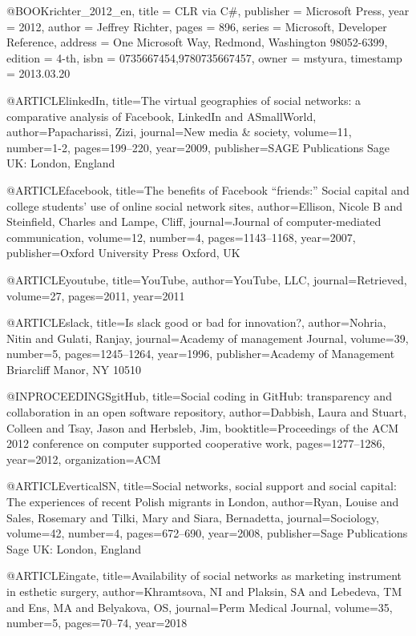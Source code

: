 @BOOK{richter_2012_en,
  title = {CLR via C\#},
  publisher = {Microsoft Press},
  year = {2012},
  author = {Jeffrey Richter},
  pages = {896},
  series = {Microsoft, Developer Reference},
  address = {One Microsoft Way, Redmond, Washington 98052-6399},
  edition = {4-th},
  isbn = {0735667454,9780735667457},
  owner = {mstyura},
  timestamp = {2013.03.20}
}

@ARTICLE{linkedIn,
  title={The virtual geographies of social networks: a comparative analysis of Facebook, LinkedIn and ASmallWorld},
  author={Papacharissi, Zizi},
  journal={New media \& society},
  volume={11},
  number={1-2},
  pages={199--220},
  year={2009},
  publisher={SAGE Publications Sage UK: London, England}
}

@ARTICLE{facebook,
  title={The benefits of Facebook “friends:” Social capital and college students’ use of online social network sites},
  author={Ellison, Nicole B and Steinfield, Charles and Lampe, Cliff},
  journal={Journal of computer-mediated communication},
  volume={12},
  number={4},
  pages={1143--1168},
  year={2007},
  publisher={Oxford University Press Oxford, UK}
}

@ARTICLE{youtube,
  title={YouTube},
  author={YouTube, LLC},
  journal={Retrieved},
  volume={27},
  pages={2011},
  year={2011}
}

@ARTICLE{slack,
  title={Is slack good or bad for innovation?},
  author={Nohria, Nitin and Gulati, Ranjay},
  journal={Academy of management Journal},
  volume={39},
  number={5},
  pages={1245--1264},
  year={1996},
  publisher={Academy of Management Briarcliff Manor, NY 10510}
}

@INPROCEEDINGS{gitHub,
  title={Social coding in GitHub: transparency and collaboration in an open software repository},
  author={Dabbish, Laura and Stuart, Colleen and Tsay, Jason and Herbsleb, Jim},
  booktitle={Proceedings of the ACM 2012 conference on computer supported cooperative work},
  pages={1277--1286},
  year={2012},
  organization={ACM}
}

@ARTICLE{verticalSN,
  title={Social networks, social support and social capital: The experiences of recent Polish migrants in London},
  author={Ryan, Louise and Sales, Rosemary and Tilki, Mary and Siara, Bernadetta},
  journal={Sociology},
  volume={42},
  number={4},
  pages={672--690},
  year={2008},
  publisher={Sage Publications Sage UK: London, England}
}

@ARTICLE{ingate,
  title={Availability of social networks as marketing instrument in esthetic surgery},
  author={Khramtsova, NI and Plaksin, SA and Lebedeva, TM and Ens, MA and Belyakova, OS},
  journal={Perm Medical Journal},
  volume={35},
  number={5},
  pages={70--74},
  year={2018}
}

